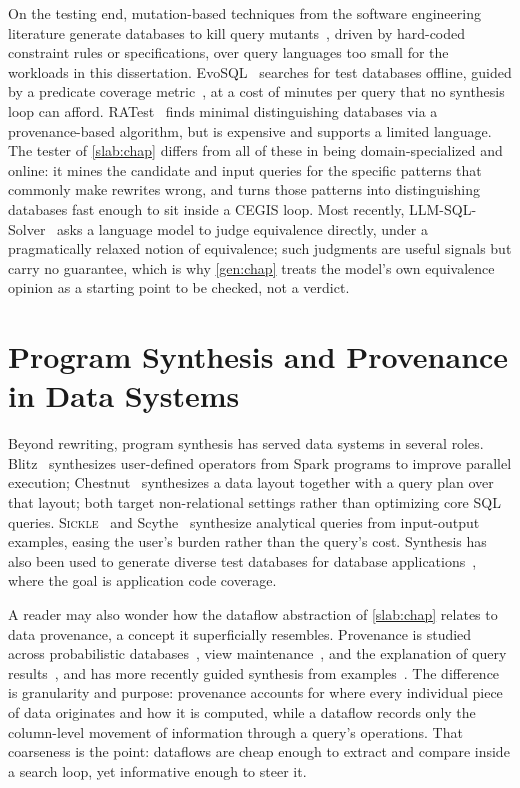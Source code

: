 On the testing end, mutation-based techniques from the software
engineering literature generate databases to kill query
mutants~\cite{chandra2015data,shah2011generating}, driven by
hard-coded constraint rules or specifications, over query languages
too small for the workloads in this dissertation.
EvoSQL~\cite{castelein2018search} searches for test databases offline,
guided by a predicate coverage metric~\cite{tuya2010full}, at a cost
of minutes per query that no synthesis loop can afford.
RATest~\cite{miao2019explaining} finds minimal distinguishing
databases via a provenance-based algorithm, but is expensive and
supports a limited language. The tester of \cref{slab:chap} differs
from all of these in being domain-specialized and online: it mines the
candidate and input queries for the specific patterns that commonly
make rewrites wrong, and turns those patterns into distinguishing
databases fast enough to sit inside a CEGIS loop. Most recently,
LLM-SQL-Solver~\cite{zhao2023llm} asks a language model to judge
equivalence directly, under a pragmatically relaxed notion of
equivalence; such judgments are useful signals but carry no guarantee,
which is why \cref{gen:chap} treats the model's own equivalence
opinion as a starting point to be checked, not a verdict.

\section{Program Synthesis and Provenance in Data Systems}
\label{sec:related:synthesis}

Beyond rewriting, program synthesis has served data systems in several
roles. Blitz~\cite{synthesis-spark,blitz2} synthesizes user-defined
operators from Spark programs to improve parallel execution;
Chestnut~\cite{chestnut} synthesizes a data layout together with a
query plan over that layout; both target non-relational settings
rather than optimizing core SQL queries.
\textsc{Sickle}~\cite{zhou2022synthesizing} and
Scythe~\cite{wang2017synthesizing} synthesize analytical queries from
input-output examples, easing the user's burden rather than the
query's cost. Synthesis has also been used to generate diverse test
databases for database
applications~\cite{qex,tesma,syndb,xie:symbolic2}, where the goal is
application code coverage.

A reader may also wonder how the dataflow abstraction of
\cref{slab:chap} relates to data provenance, a concept it
superficially resembles. Provenance is studied across probabilistic
databases~\cite{green2006models,suciu2011probabilistic}, view
maintenance~\cite{buneman2002propagation}, and the explanation of
query results~\cite{green2007provenance,chapman2009not}, and has more
recently guided synthesis from
examples~\cite{raghothaman2020provenance,zhou2022synthesizing}. The
difference is granularity and purpose: provenance accounts for where
every individual piece of data originates and how it is computed,
while a dataflow records only the column-level movement of information
through a query's operations. That coarseness is the point: dataflows
are cheap enough to extract and compare inside a search loop, yet
informative enough to steer it.

